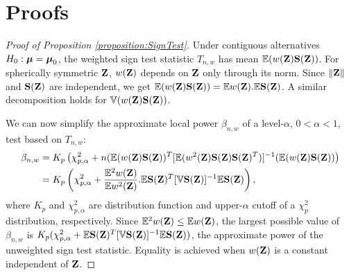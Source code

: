 
\section{Proofs}
\label{section:appC}

\begin{proof}[Proof of Proposition \ref{proposition:SignTest}]
Under contiguous alternatives $H_0: {\boldsymbol{\mu}} = {\boldsymbol{\mu}}_0$, the weighted sign test statistic $T_{n,w}$ has mean ${\mathbb{E}} (w({\mathbf{Z}}) {\mathbf{S}} ({\mathbf{Z}}))$. For spherically symmetric ${\mathbf{Z}}$, $w({\mathbf{Z}})$ depends on ${\mathbf{Z}}$ only through its norm. Since $\| {\mathbf{Z}} \|$ and ${\mathbf{S}}({\mathbf{Z}})$ are independent, we get ${\mathbb{E}} (w({\mathbf{Z}}) {\mathbf{S}} ({\mathbf{Z}})) = {\mathbb{E}} w({\mathbf{Z}}). {\mathbb{E}} {\mathbf{S}} ({\mathbf{Z}})$. A similar decomposition holds for ${\mathbb{V}} (w({\mathbf{Z}}) {\mathbf{S}}({\mathbf{Z}}))$.

We can now simplify the approximate local power $\beta_{n,w}$ of a level-$\alpha$, $0 < \alpha < 1$, test based on $T_{n,w}$:
%
\begin{align*}
\beta_{n,w} &= K_p \left( \chi^2_{p,\alpha} + n ({\mathbb{E}} (w({\mathbf{Z}}) {\mathbf{S}} ({\mathbf{Z}}))^T
[ {\mathbb{E}} (w^2({\mathbf{Z}}) {\mathbf{S}} ({\mathbf{Z}}) {\mathbf{S}} ({\mathbf{Z}})^T) ]^{-1} ({\mathbb{E}} (w({\mathbf{Z}}) {\mathbf{S}} ({\mathbf{Z}})) \right)\\
&= K_p \left( \chi^2_{p,\alpha} + \frac{{\mathbb{E}}^2 w({\mathbf{Z}})}{{\mathbb{E}} w^2({\mathbf{Z}})}. {\mathbb{E}}{\mathbf{S}}({\mathbf{Z}})^T [{\mathbb{V}} {\mathbf{S}}({\mathbf{Z}})]^{-1} {\mathbb{E}} {\mathbf{S}}({\mathbf{Z}}) \right),
\end{align*}
%
where $K_p$ and $\chi^2_{p,\alpha}$ are distribution function and upper-$\alpha$ cutoff of a $\chi^2_p$ distribution, respectively. Since ${\mathbb{E}}^2 w({\mathbf{Z}}) \leq {\mathbb{E}} w({\mathbf{Z}})$, the largest possible value of $\beta_{n,w}$ is $K_p ( \chi^2_{p,\alpha} + {\mathbb{E}} {\mathbf{S}}({\mathbf{Z}})^T [{\mathbb{V}} {\mathbf{S}}({\mathbf{Z}})]^{-1} {\mathbb{E}} {\mathbf{S}}({\mathbf{Z}}) )$, the approximate power of the unweighted sign test statistic. Equality is achieved when $w({\mathbf{Z}})$ is a constant independent of ${\mathbf{Z}}$.
\end{proof}

